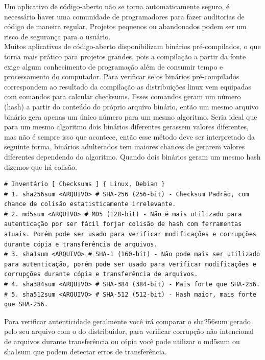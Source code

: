 \documentclass[12pt,a4paper]{article}
\begin{document}
\vspace{\baselineskip}

Um aplicativo de código-aberto não se torna automaticamente seguro, é necessário haver uma comunidade de programadores para fazer auditorias de código de maneira regular. Projetos pequenos ou abandonados podem ser um risco de segurança para o usuário. \\

Muitos aplicativos de código-aberto disponibilizam binários pré-compilados, o que torna mais prático para projetos grandes, pois a compilação a partir da fonte exige algum conhecimento de programação além de consumir tempo e processamento do computador. Para verificar se os binários pré-compilados correspondem ao resultado da compilação as distribuições linux vem equipadas com comandos para calcular checksums. Esses comandos geram um número (hash) a partir do conteúdo do próprio arquivo binário, então um mesmo arquivo binário gera apenas um único número para um mesmo algoritmo. Seria ideal que para um mesmo algoritmo dois binários diferentes gerassem valores diferentes, mas não é sempre isso que acontece, então esse método deve ser interpretado da seguinte forma, binários adulterados tem maiores chances de gerarem valores diferentes dependendo do algoritmo. Quando dois binários geram um mesmo hash dizemos que há colisão. \\

\begin{lstlisting}
# Inventário [ Checksums ] { Linux, Debian }
# 1. sha256sum <ARQUIVO> # SHA-256 (256-bit) - Checksum Padrão, com chance de colisão estatisticamente irrelevante. 
# 2. md5sum <ARQUIVO> # MD5 (128-bit) - Não é mais utilizado para autenticação por ser fácil forjar colisão de hash com ferramentas atuais. Porém pode ser usado para verificar modificações e corrupções durante cópia e transferência de arquivos. 
# 3. sha1sum <ARQUIVO> # SHA-1 (160-bit) - Não pode mais ser utilizado para autenticação, porém pode ser usado para verificar modificações e corrupções durante cópia e transferência de arquivos.
# 4. sha384sum <ARQUIVO> # SHA-384 (384-bit) - Mais forte que SHA-256.
# 5. sha512sum <ARQUIVO> # SHA-512 (512-bit) - Hash maior, mais forte que SHA-256.
\end{lstlisting}

\vspace{\baselineskip}

Para verificar autenticidade geralmente você irá comparar o sha256sum gerado pelo seu arquivo com o do distribuidor, para verificar corrupção não intencional de arquivos durante transferência ou cópia você pode utilizar o md5sum ou sha1sum que podem detectar erros de transferência. \\
\end{document}
